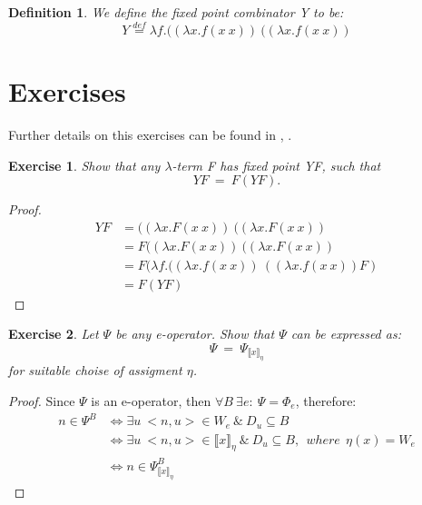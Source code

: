 \documentclass{article}
\newtheorem{definition}{Definition}[section] %
\newtheorem{exercise}{Exercise}[section]
\begin{document}
	\begin{definition}
		We define the fixed point combinator Y to be:
		\begin{equation}
			Y \stackrel{def}{=} \lambda f.
				((\lambda x. f(x\:x))\:
				((\lambda x. f(x\:x))
		\end{equation}
	\end{definition}

	\section{Exercises}
	Further details on this exercises can be found in 
		\cite{COM_COOPER}, \cite{COM_ODIFREDDI}.
	\begin{exercise}
		Show that any $\lambda$-term F has fixed point YF, such that
			\begin{equation}
				YF\:=\:F(YF).
			\end{equation}
	\end{exercise}
	\begin{proof}
		\begin{equation*}
     \begin{split}
			YF &= ((\lambda x. F(x\:x))\:((\lambda x. F(x\:x))\\
				&= F((\lambda x. F(x\:x))\:((\lambda x. F(x\:x))\\
				&= F(\lambda f. 
						((\lambda x. f(x\:x))\:
						((\lambda x. f(x\:x)) F)\\
				&= F(YF)
     \end{split}
		\end{equation*}
	\end{proof}

	\begin{exercise}
		Let $\Psi$ be any e-operator. Show that $\Psi$ can be
		expressed as:
			\begin{equation}
				\Psi\:=\:\Psi_{\llbracket x \rrbracket_{\eta}}
			\end{equation}
		for suitable choise of assigment $\eta$.
	\end{exercise}
	\begin{proof}
		Since $\Psi$ is an e-operator, then 
		$\forall B \: \exists e:\: \Psi = \Phi_e$, therefore:
		\begin{equation*}
		\begin{split}
			n \in \Psi^B &\iff \exists u \: 
				<n, u> \in W_e \:\&\: D_u \subseteq B\\
			&\iff \exists u \: <n, u> \in 
				\llbracket x \rrbracket_{\eta} \:\&\: D_u \subseteq B
				,\:\: where \:\:\eta(x) = W_e\\
			&\iff n \in \Psi_{\llbracket x \rrbracket_{\eta}}^B
		\end{split}
		\end{equation*}
	\end{proof}
\end{document}
